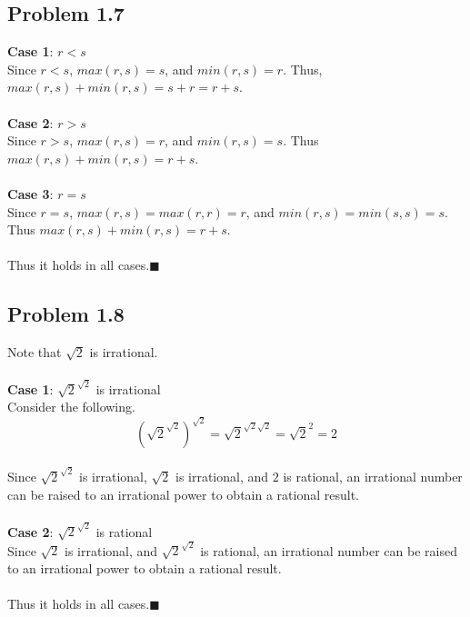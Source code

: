 \documentclass{article}
\begin{document}
\subsection{Problem 1.7}
\textbf{Case 1}: $r<s$\\
Since $r<s$, $max(r,s)=s$, and $min(r,s)=r$. Thus, $max(r,s)+min(r,s)=s+r=r+s$.\\
\\
\textbf{Case 2}: $r>s$\\
Since $r>s$, $max(r,s)=r$, and $min(r,s)=s$. Thus $max(r,s)+min(r,s)=r+s$.\\
\\
\textbf{Case 3}: $r=s$\\
Since $r=s$, $max(r,s)=max(r,r)=r$, and $min(r,s)=min(s,s)=s$. Thus $max(r,s)+min(r,s)=r+s$.\\
\\
Thus it holds in all cases.\hfill$\blacksquare$
\subsection{Problem 1.8}
\newcommand{\stwo}{\sqrt{2}}
\newcommand{\stst}{\stwo^{\stwo}}
Note that $\stwo$ is irrational.\\
\\
\textbf{Case 1}: $\stst$ is irrational\\
Consider the following.\\
$$(\stst)^{\stwo}=\stwo^{\stwo\stwo}=\stwo^2=2$$\\
Since $\stst$ is irrational, $\stwo$ is irrational, and $2$ is rational, an irrational number can be raised to an irrational power to obtain a rational result.\\
\\
\textbf{Case 2}: $\stst$ is rational\\
Since $\stwo$ is irrational, and $\stst$ is rational, an irrational number can be raised to an irrational power to obtain a rational result.\\
\\
Thus it holds in all cases.\hfill$\blacksquare$
\end{document}
